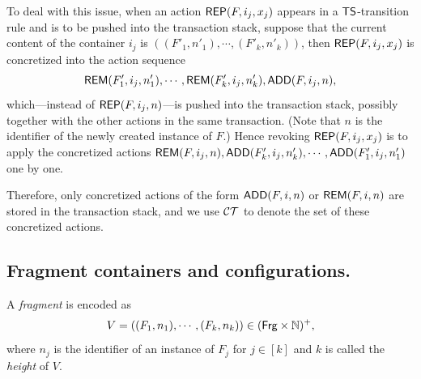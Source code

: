 
%
To deal with this issue, 
when an action $\mathsf{REP}(F, i_j, x_j)$ appears in a ${\sf TS}$-transition rule and is to be pushed into the transaction stack, suppose that the current content of the container $i_j$ is $((F'_1,n'_1),  \cdots, (F'_k, n'_k))$, then $\mathsf{REP}(F, i_j, x_j)$ is concretized into the action sequence 
$$\mathsf{REM}(F'_1, i_j, n'_1), \cdots, \mathsf{REM}(F'_k, i_j, n'_k), \mathsf{ADD}(F, i_j, n),$$ 
which---instead of $\mathsf{REP}(F, i_j, n)$---is pushed into the transaction stack, possibly together with the other actions in the same transaction. 
(Note that $n$ is the identifier of the newly created instance of $F$.)
Hence revoking $\mathsf{REP}(F, i_j, x_j)$ is to apply the concretized actions
$\mathsf{REM}(F, i_j, n), \mathsf{ADD}(F'_k, i_j, n'_k), \cdots, \mathsf{ADD}(F'_1, i_j, n'_1)$ one by one.

Therefore, only concretized actions of the form $\mathsf{ADD}(F, i, n)$ or $\mathsf{REM}(F, i, n)$ are stored in the transaction stack, and we use $\mathcal{CT}$ to denote the set of these concretized actions.  



\subsection*{Fragment containers and configurations.}
%
 
A \emph{fragment \container} is encoded as 
$$V = ((F_1, n_1), \cdots, (F_k, n_k)) \in ({\sf Frg} \times {\mathbb{N} })^+ ,$$ where $n_j$ is the identifier of an instance of $F_j$ for $j \in [k]$ and $k$ is called the \emph{height} of $V$.

